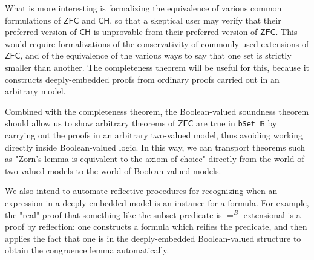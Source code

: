 \documentclass[a4paper,USenglish,cleveref, autoref]{lipics-v2019}
\theoremstyle{definition}
\begin{document}
What is more interesting is formalizing the equivalence of various common formulations of $\mathsf{ZFC}$ and $\mathsf{CH}$, so that a skeptical user may verify that their preferred version of $\mathsf{CH}$ is unprovable from their preferred version of $\mathsf{ZFC}$. This would require formalizations of the conservativity of commonly-used extensions of $\mathsf{ZFC}$, and of the equivalence of the various ways to say that one set is strictly smaller than another. The completeness theorem will be useful for this, because it constructs deeply-embedded proofs from ordinary proofs carried out in an arbitrary model.

Combined with the completeness theorem, the Boolean-valued soundness theorem should allow us to show arbitrary theorems of $\mathsf{ZFC}$ are true in \lstinline{bSet 𝔹} by carrying out the proofs in an arbitrary two-valued model, thus avoiding working directly inside Boolean-valued logic. In this way, we can transport theorems such as "Zorn's lemma is equivalent to the axiom of choice" directly from the world of two-valued models to the world of Boolean-valued models.

We also intend to automate reflective procedures for recognizing when an expression in a deeply-embedded model is an instance for a formula. For example, the "real" proof that something like the subset predicate is $=^B$-extensional is a proof by reflection: one constructs a formula which reifies the predicate, and then applies the fact that one is in the deeply-embedded Boolean-valued structure to obtain the congruence lemma automatically.




\end{document}
